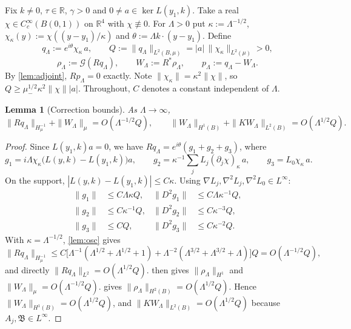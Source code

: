 \documentclass[11pt]{article}
\theoremstyle{plain}
\newtheorem{lemma}[theorem]{Lemma}
\theoremstyle{definition}
\theoremstyle{remark}
\newcommand{\R}{\mathbb{R}}
\begin{document}
Fix $k \neq 0$, $\tau \in \R$, $\gamma > 0$ and $0 \neq a \in \ker L(y_1,k)$. Take a real $\chi \in C^\infty_c(B(0,1))$ on $\R^4$ with $\chi \not\equiv 0$. For $\Lambda > 0$ put $\kappa := \Lambda^{-1/2}$, $\chi_\kappa(y) := \chi((y-y_1)/\kappa)$ and $\theta := \Lambda k\cdot(y - y_1)$. Define
\[
  q_\Lambda := e^{i\theta}\chi_\kappa\,a,\qquad
  Q := \|q_\Lambda\|_{L^2(B,\mu)} = |a|\,\|\chi_\kappa\|_{L^2(\mu)} > 0,
\]
\[
  \rho_\Lambda := \mathcal G(Rq_\Lambda),\qquad W_\Lambda := R^*\rho_\Lambda,\qquad p_\Lambda := q_\Lambda - W_\Lambda .
\]
By \cref{lem:adjoint}, $Rp_\Lambda = 0$ exactly. Note $\|\chi_\kappa\| = \kappa^2\|\chi\|$, so $Q \ge \mu_-^{1/2}\kappa^2\|\chi\||a|$. Throughout, $C$ denotes a constant independent of $\Lambda$.

\begin{lemma}[Correction bounds]\label{lem:sizes}
As $\Lambda \to \infty$,
\[
  \|Rq_\Lambda\|_{H^{-1}_\mu} + \|W_\Lambda\|_\mu = O(\Lambda^{-1/2}Q),\qquad
  \|W_\Lambda\|_{H^1(B)} + \|KW_\Lambda\|_{L^2(B)} = O(\Lambda^{1/2}Q).
\]
\end{lemma}

\begin{proof}
Since $L(y_1,k)a = 0$, we have
$Rq_\Lambda = e^{i\theta}(g_1 + g_2 + g_3)$, where
\[
  g_1 = i\Lambda\chi_\kappa\bigl(L(y,k) - L(y_1,k)\bigr)a,\qquad
  g_2 = \kappa^{-1}\sum_jL_j(\partial_j\chi)_\kappa\, a,\qquad
  g_3 = L_0\chi_\kappa\, a .
\]
On the support, $|L(y,k) - L(y_1,k)| \le C\kappa$. Using $\nabla L_j, \nabla^2L_j, \nabla^2L_0 \in L^\infty$:
\begin{align*}
  \|g_1\| &\le C\Lambda\kappa Q, & \|D^2g_1\| &\le C\Lambda\kappa^{-1}Q,\\
  \|g_2\| &\le C\kappa^{-1}Q,    & \|D^2g_2\| &\le C\kappa^{-3}Q,\\
  \|g_3\| &\le CQ,                & \|D^2g_3\| &\le C\kappa^{-2}Q .
\end{align*}
With $\kappa = \Lambda^{-1/2}$, \cref{lem:osc} gives
\[
  \|Rq_\Lambda\|_{H^{-1}_\mu} \le C\bigl[\Lambda^{-1}(\Lambda^{1/2} + \Lambda^{1/2} + 1) + \Lambda^{-2}(\Lambda^{3/2} + \Lambda^{3/2} + \Lambda)\bigr]Q = O(\Lambda^{-1/2}Q),
\]
and directly $\|Rq_\Lambda\|_{L^2} = O(\Lambda^{1/2}Q)$.  then gives $\|\rho_\Lambda\|_{H^1}$ and $\|W_\Lambda\|_\mu = O(\Lambda^{-1/2}Q)$.  gives $\|\rho_\Lambda\|_{H^2(B)} = O(\Lambda^{1/2}Q)$. Hence $\|W_\Lambda\|_{H^1(B)} = O(\Lambda^{1/2}Q)$, and $\|KW_\Lambda\|_{L^2(B)} = O(\Lambda^{1/2}Q)$ because $A_j, \mathfrak B \in L^\infty$.
\end{proof}
\end{document}
